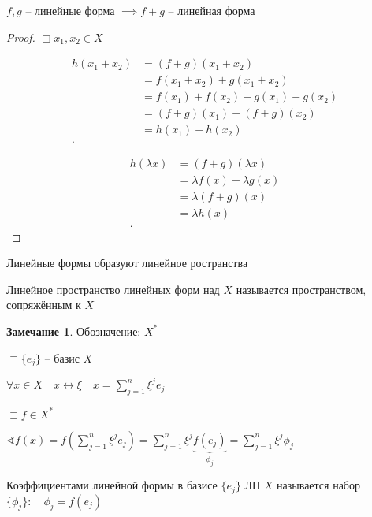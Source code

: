 \documentclass{book}
\theoremstyle{definition}
\newtheorem*{note}{Замечание}
\begin{document}
\begin{lemma}
    $f,g$ -- линейные форма  $\implies f+g$ -- линейная форма
\end{lemma}
\begin{proof}
    $\sqsupset x_1, x_2\in X$

    \begin{align*}
        h\left( x_1+x_2 \right) &= (f+g)(x_1+x_2) \\
                                &= f(x_1+x_2) + g(x_1+x_2) \\
                                &= f(x_1) + f(x_2) + g(x_1) + g(x_2)\\ 
                                &= (f+g)(x_1) + (f+g)(x_2)  \\
                                &= h(x_1) + h(x_2) \\
    .\end{align*}

     \begin{align*}
         h\left( \lambda x \right) &= (f+g)(\lambda x) \\
                                    &= \lambda f(x) + \lambda g(x)\\
                                    &= \lambda(f+g)(x) \\
                                    &= \lambda h(x) \\
    .\end{align*}
\end{proof}

\begin{theorem}
    Линейные формы образуют линейное ространства
\end{theorem}

\begin{definition}
    Линейное пространство линейных форм над $X$ называется пространством, сопряжённым к $X$
\end{definition}
\begin{note}
    Обозначение: $X^*$
\end{note}

$\sqsupset \{e_j\}$ -- базис $X$

 $\forall x\in X\quad x \longleftrightarrow \xi\quad x = \sum_{j=1}^{n} \xi^je_j$ 

 $\sqsupset f\in X^*$

 $\sphericalangle f(x) = f\left( \sum_{j=1}^{n} \xi^je_j \right)  = \sum_{j=1}^{n} \xi^j \underbrace{f\left( e_j \right)}\limits_{\phi_j}  = \sum_{j=1}^{n} \xi^j\phi_j$ 
\begin{definition}
    Коэффициентами линейной формы в базисе $\{e_j\}$ ЛП  $X$ называется набор  $\{\phi_j\}:\quad \phi_j = f\left( e_j \right) $
\end{definition}
\end{document}
